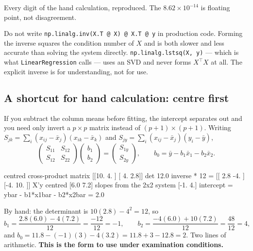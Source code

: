 \documentclass[11pt]{article}
\newcommand{\Xt}{X^{\!\top}}
\begin{document}
Every digit of the hand calculation, reproduced. The $8.62\times10^{-14}$ is
floating point, not disagreement.

\begin{caution}
Do not write \texttt{np.linalg.inv(X.T @ X) @ X.T @ y} in production code.
Forming the inverse squares the condition number of $X$ and is both slower and
less accurate than solving the system directly.
\texttt{np.linalg.lstsq(X, y)} --- which is what \texttt{LinearRegression}
calls --- uses an SVD and never forms $\Xt X$ at all. The explicit inverse is
for understanding, not for use.
\end{caution}

\subsection{A shortcut for hand calculation: centre first}
\label{sec:centred}

If you subtract the column means before fitting, the intercept separates out
and you need only invert a $p\times p$ matrix instead of $(p+1)\times(p+1)$.
Writing $S_{jk} = \sum_i (x_{ij}-\bar x_j)(x_{ik}-\bar x_k)$ and
$S_{jy} = \sum_i (x_{ij}-\bar x_j)(y_i-\bar y)$,
\begin{equation}
  \label{eq:centred}
  \begin{pmatrix} S_{11} & S_{12}\\ S_{12} & S_{22}\end{pmatrix}
  \begin{pmatrix} b_1\\ b_2\end{pmatrix}
  = \begin{pmatrix} S_{1y}\\ S_{2y}\end{pmatrix},
  \qquad
  b_0 = \bar y - b_1\bar x_1 - b_2\bar x_2 .
\end{equation}

\begin{codeout}
centred cross-product matrix
 [[10.   4. ]
 [ 4.   2.8]]
det 12.0   inverse * 12 =
 [[ 2.8 -4. ]
 [-4.  10. ]]
X'y centred       [6.0 7.2]
slopes from the 2x2 system [-1.  4.]
intercept = ybar - b1*x1bar - b2*x2bar = 2.0
\end{codeout}

By hand: the determinant is $10(2.8) - 4^2 = 12$, so
\[
  b_1 = \frac{2.8(6.0) - 4(7.2)}{12} = \frac{-12}{12} = -1,
  \qquad
  b_2 = \frac{-4(6.0) + 10(7.2)}{12} = \frac{48}{12} = 4,
\]
and $b_0 = 11.8 - (-1)(3) - 4(3.2) = 11.8 + 3 - 12.8 = 2$. Two lines of
arithmetic. \textbf{This is the form to use under examination conditions.}
\end{document}
